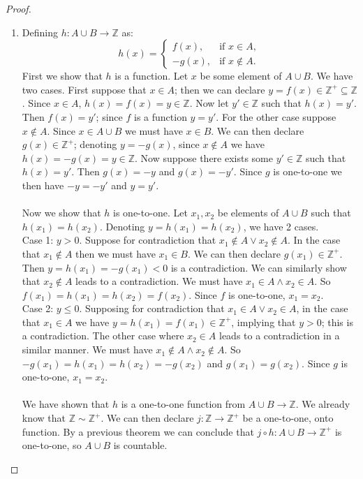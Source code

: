 \documentclass{report}
\theoremstyle{definition}
\begin{document}
\begin{proof}
\begin{enumerate}
(next page)\newpage
\item Defining $h:A\cup B\to\mathbb Z$ as:
\begin{equation*}
h(x)=\begin{cases}
f(x),&\text{if }x\in A,\\
-g(x),&\text{if }x\notin A.
\end{cases}
\end{equation*}
First we show that $h$ is a function. Let $x$ be some element of $A\cup B$. 
We have two cases. First suppose that $x\in A$; then we can declare $y=f(x)\in\mathbb Z^+\subseteq\mathbb Z$. Since $x\in A$, $h(x)=f(x)=y\in\mathbb Z$. Now let $y'\in\mathbb Z$ such that $h(x)=y'$.
Then $f(x)=y'$; since $f$ is a function $y=y'$. For the other case suppose $x\notin A$. Since $x\in A\cup B$ we must have $x\in B$. We can then declare $g(x)\in\mathbb Z^+$; denoting $y=-g(x)$, since $x\notin A$ we
have $h(x)=-g(x)=y\in\mathbb Z$. Now suppose there exists some $y'\in\mathbb Z$ such that $h(x)=y'$.
Then $g(x)=-y$ and $g(x)=-y'$. Since $g$ is one-to-one we then have $-y=-y'$ and $y=y'$.\\
\vspace{1mm}\\
Now we show that $h$ is one-to-one. Let $x_1,x_2$ be elements of $A\cup B$ such that $h(x_1)=h(x_2)$. Denoting $y=h(x_1)=h(x_2)$, we have 2 cases.\\
Case 1: $y>0$. Suppose for contradiction that $x_1\notin A\lor x_2\notin A$. In the case that $x_1\notin A$ then we must have $x_1\in B$. We can then declare $g(x_1)\in\mathbb Z^+$. Then
$y=h(x_1)=-g(x_1)<0$ is a contradiction. We can similarly show that $x_2\notin A$ leads to a contradiction. We must have $x_1\in A\land x_2\in A$. So $f(x_1)=h(x_1)=h(x_2)=f(x_2)$. Since $f$ is 
one-to-one, $x_1=x_2$.\\
Case 2: $y\leq0$. Supposing for contradiction that $x_1\in A\lor x_2\in A$, in the case that $x_1\in A$ we have $y=h(x_1)=f(x_1)\in\mathbb Z^+$, implying that $y>0$; this is a contradiction. 
The other case where $x_2\in A$ leads to a contradiction in a similar manner. We must have $x_1\notin A\land x_2\notin A$. So $-g(x_1)=h(x_1)=h(x_2)=-g(x_2)$ and $g(x_1)=g(x_2)$.
Since $g$ is one-to-one, $x_1=x_2$.\\
\vspace{1mm}\\
We have shown that $h$ is a one-to-one function from $A\cup B\to\mathbb Z$. We already know that
$\mathbb Z\sim\mathbb Z^+$. We can then declare $j:\mathbb Z\to\mathbb Z^+$ be a one-to-one, onto
function. By a previous theorem we can conclude that $j\circ h:A\cup B\to\mathbb Z^+$ is one-to-one, so $A\cup B$ is countable.\qedhere
\end{enumerate}
\end{proof}
\end{document}
